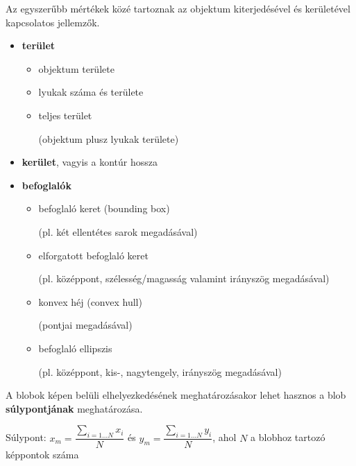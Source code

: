 \bigskip

Az egyszerűbb mértékek közé tartoznak az objektum kiterjedésével és kerületével kapcsolatos jellemzők.

\begin{itemize}
  \item \textbf{terület}
    \begin{itemize}
      \item objektum területe
      \item lyukak száma és területe
      \item teljes terület \\ \begin{small}(objektum plusz lyukak területe)\end{small}
    \end{itemize}
  \item \textbf{kerület}, vagyis a kontúr hossza
  \item \textbf{befoglalók}
    \begin{itemize}
      \item befoglaló keret (bounding box) \\ \begin{small}(pl. két ellentétes sarok megadásával)\end{small}
      \item elforgatott befoglaló keret \\ \begin{small}(pl. középpont, szélesség/magasság valamint irányszög megadásával)\end{small}
      \item konvex héj (convex hull) \\ \begin{small}(pontjai megadásával)\end{small}
      \item befoglaló ellipszis \\ \begin{small}(pl. középpont, kis-, nagytengely, irányszög megadásával)\end{small}
    \end{itemize}
\end{itemize}

\bigskip

A blobok képen belüli elhelyezkedésének meghatározásakor lehet hasznos a blob \textbf{súlypontjának} meghatározása.

\begin{definition}{Súlypont:}
$x_m = \dfrac{\sum_{i=1 \dots N} x_i}{N}$ és $y_m = \dfrac{\sum_{i=1 \dots N} y_i}{N}$, ahol $N$ a blobhoz tartozó képpontok száma
\end{definition}


